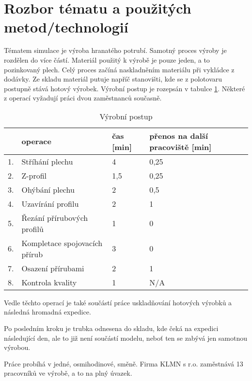 \documentclass[11pt, a4paper]{article}
\begin{document}
\section{Rozbor tématu a použitých metod/technologií}
Tématem simulace je výroba hranatého potrubí. Samotný proces výroby je rozdělen do více částí. Materiál použitý k výrobě je pouze jeden, a to pozinkovaný plech.%
Celý proces začíná naskladněním materiálu při vykládce z dodávky. Ze skladu materiál putuje napříč stanovišti, kde se z polotovaru postupně stává hotový výrobek. Výrobní postup je rozepsán v tabulce \ref{rgrg}. Některé z operací vyžadují práci dvou zaměstnanců současně.

\begin{table}[H]
    \centering
    \begin{tabular}{|l|l|l|l|}
     \hline  & \textbf{operace} &  \textbf{čas [min]} &  \textbf{přenos na další pracoviště [min]}\\ \hline
    1. &                Stříhání plechu   &  4 &  0,25\\ \hline
    2. &                Z-profil    &  1,5 &  0,25\\ \hline
    3. &                Ohýbání plechu    &  2  &  0,5\\ \hline
    4. &                Uzavírání profilu    & 2 &  1\\  \hline
    5. &                Řezání přírubových profilů    &  1 &  0\\ \hline
    6. &               Kompletace spojovacích přírub    &  3 &  0\\ \hline
    7. &                Osazení přírubami    &  2 &  1\\
    \hline
    8. &                Kontrola kvality    & 1  &  N/A\\
    \hline


    \end{tabular}
    \caption{Výrobní postup}
    \label{rgrg}
\end{table}

Vedle těchto operací je také součástí práce uskladňování hotových výrobků a následná hromadná expedice.

Po posledním kroku je trubka odnesena do skladu, kde čeká na expedici následující den, ale to již není součástí modelu, neboť ten se zabývá jen samotnou výrobou.

Práce probíhá v jedné, osmihodinové, směně. Firma KLMN s r.o. zaměstnává 13 pracovníků ve výrobě, a to na plný úvazek.
\end{document}
